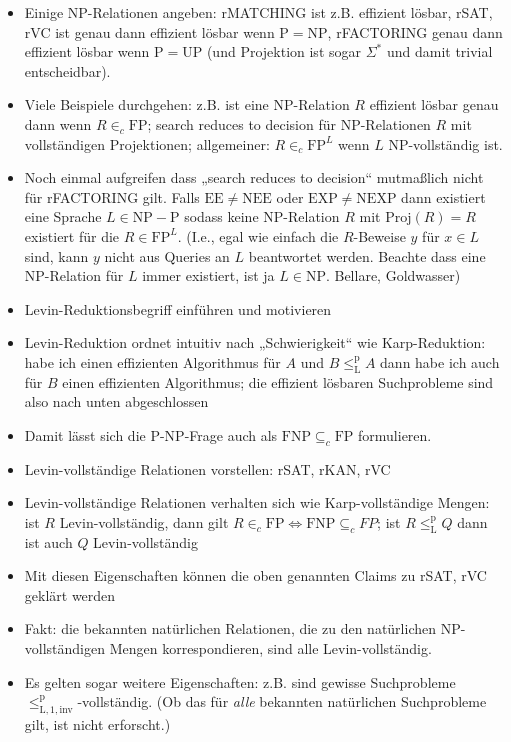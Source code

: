 \documentclass[nofonts]{uebung}
\def\P{\ensuremath{\mathrm{P}}}
\def\NP{\ensuremath{\mathrm{NP}}}
\def\FP{\ensuremath{\mathrm{FP}}}
\def\UP{\ensuremath{\mathrm{UP}}}
\begin{document}
\begin{enumerate}[label*=\arabic*.]
\begin{enumerate}[label*=\arabic*.]
\begin{itemize}
                    \item Einige NP-Relationen angeben: rMATCHING ist z.B. effizient lösbar, rSAT, rVC ist genau dann effizient lösbar wenn $\P=\NP$, rFACTORING genau dann effizient lösbar wenn $\P=\UP$ (und Projektion ist sogar $\Sigma^*$ und damit trivial entscheidbar).
                    \item Viele Beispiele durchgehen: z.B. ist eine NP-Relation $R$ effizient lösbar genau dann wenn $R\in_c \FP$; search reduces to decision für NP-Relationen $R$ mit vollständigen Projektionen; allgemeiner: $R\in_c\FP^L$ wenn $L$ NP-vollständig ist.
                    \item Noch einmal aufgreifen dass „search reduces to decision“ mutmaßlich nicht für rFACTORING gilt. Falls $\mathrm{EE\neq NEE}$ oder $\mathrm{EXP\neq NEXP}$ dann existiert eine Sprache $L\in\NP - \P$ sodass keine NP-Relation $R$ mit $\mathrm{Proj}(R)=R$ existiert für die $R\in\FP^L$. (I.e., egal wie einfach die $R$-Beweise $y$ für $x\in L$ sind, kann $y$ nicht aus Queries an $L$ beantwortet werden. Beachte dass eine NP-Relation für $L$ immer existiert, ist ja $L\in\NP$. Bellare, Goldwasser)
                    \item Levin-Reduktionsbegriff einführen und motivieren
                    \item Levin-Reduktion ordnet intuitiv nach „Schwierigkeit“ wie Karp-Reduktion: habe ich einen effizienten Algorithmus für $A$ und $B\leq_\mathrm L^\mathrm p A$ dann habe ich auch für $B$ einen effizienten Algorithmus; die effizient lösbaren Suchprobleme sind also nach unten abgeschlossen
                    \item Damit lässt sich die P-NP-Frage auch als $\mathrm{FNP}\subseteq_c \mathrm{FP}$ formulieren.
                    \item Levin-vollständige Relationen vorstellen: rSAT, rKAN, rVC
                    \item Levin-vollständige Relationen verhalten sich wie Karp-vollständige Mengen: ist $R$ Levin-vollständig, dann gilt $R\in_c\mathrm{FP} \iff \mathrm{FNP}\subseteq_c {FP}$; ist $R\leq_\mathrm L^\mathrm p Q$ dann ist auch $Q$ Levin-vollständig
                    \item Mit diesen Eigenschaften können die oben genannten Claims zu rSAT, rVC geklärt werden
                    \item Fakt: die bekannten natürlichen Relationen, die zu den natürlichen NP-vollständigen Mengen korrespondieren, sind alle Levin-vollständig.
                    \item Es gelten sogar weitere Eigenschaften: z.B. sind gewisse Suchprobleme $\leq_\mathrm{L,1,inv}^\mathrm p$-vollständig. (Ob das für \emph{alle} bekannten natürlichen Suchprobleme gilt, ist nicht erforscht.)

\end{itemize}
\end{enumerate}
\end{enumerate}
\end{document}
